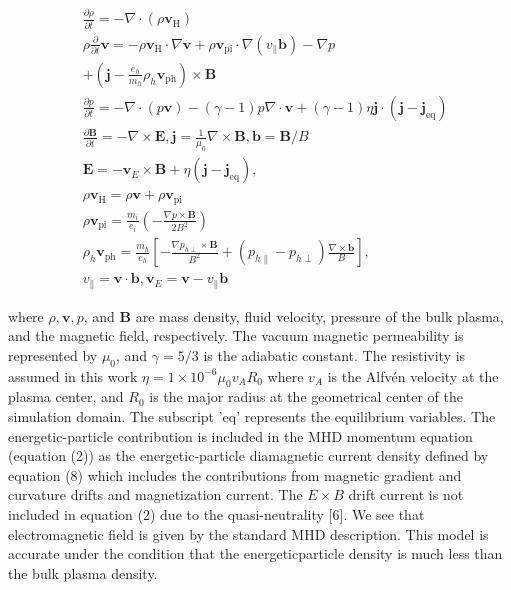 \documentclass[10pt]{article}
\begin{document}
$$
\begin{aligned}
& \frac{\partial \rho}{\partial t}=-\nabla \cdot\left(\rho \mathbf{v}_{\mathrm{H}}\right) \\
& \rho \frac{\partial}{\partial t} \mathbf{v}=-\rho \mathbf{v}_{\mathrm{H}} \cdot \nabla \mathbf{v}+\rho \mathbf{v}_{\mathrm{pi}} \cdot \nabla\left(v_{\|} \mathbf{b}\right)-\nabla p \\
& +\left(\mathbf{j}-\frac{e_{h}}{m_{h}} \rho_{h} \mathbf{v}_{\mathrm{ph}}\right) \times \mathbf{B} \\
& \frac{\partial p}{\partial t}=-\nabla \cdot(p \mathbf{v})-(\gamma-1) p \nabla \cdot \mathbf{v}+(\gamma-1) \eta \mathbf{j} \cdot\left(\mathbf{j}-\mathbf{j}_{\mathrm{eq}}\right) \\
& \frac{\partial \mathbf{B}}{\partial t}=-\nabla \times \mathbf{E}, \mathbf{j}=\frac{1}{\mu_{0}} \nabla \times \mathbf{B}, \mathbf{b}=\mathbf{B} / B \\
& \mathbf{E}=-\mathbf{v}_{E} \times \mathbf{B}+\eta\left(\mathbf{j}-\mathbf{j}_{\mathrm{eq}}\right), \\
& \rho \mathbf{v}_{\mathrm{H}}=\rho \mathbf{v}+\rho \mathbf{v}_{\mathrm{pi}} \\
& \rho \mathbf{v}_{\mathrm{pi}}=\frac{m_{i}}{e_{i}}\left(-\frac{\nabla p \times \mathbf{B}}{2 B^{2}}\right) \\
& \rho_{h} \mathbf{v}_{\mathrm{ph}}=\frac{m_{h}}{e_{h}}\left[-\frac{\nabla p_{h \perp} \times \mathbf{B}}{B^{2}}+\left(p_{h \|}-p_{h \perp}\right) \frac{\nabla \times \mathbf{b}}{B}\right], \\
& v_{\|}=\mathbf{v} \cdot \mathbf{b}, \mathbf{v}_{E}=\mathbf{v}-v_{\|} \mathbf{b}
\end{aligned}
$$

where $\rho, \mathbf{v}, p$, and $\mathbf{B}$ are mass density, fluid velocity, pressure of the bulk plasma, and the magnetic field, respectively. The vacuum magnetic permeability is represented by $\mu_{0}$, and $\gamma=5 / 3$ is the adiabatic constant. The resistivity is assumed in this work $\eta=1 \times 10^{-6} \mu_{0} v_{A} R_{0}$ where $v_{A}$ is the Alfvén velocity at the plasma center, and $R_{0}$ is the major radius at the geometrical center of the simulation domain. The subscript 'eq' represents the equilibrium variables. The energetic-particle contribution is included in the MHD momentum equation (equation (2)) as the energetic-particle diamagnetic current density defined by equation (8) which includes the contributions from magnetic gradient and curvature drifts and magnetization current. The $E \times B$ drift current is not included in equation (2) due to the quasi-neutrality [6]. We see that electromagnetic field is given by the standard MHD description. This model is accurate under the condition that the energeticparticle density is much less than the bulk plasma density.
\end{document}
